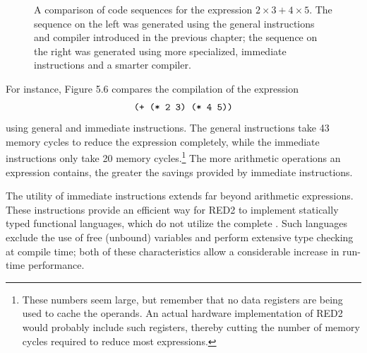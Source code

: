 \begin{figure}[htbp]
\centering
\setlength{\fboxsep}{8pt}
\renewcommand{\arraystretch}{1.15}
\caption[Comparing general and immediate instructions]{A comparison of code sequences for the expression \(2 \times 3 +
4 \times 5\). The sequence on the left was generated using the general
instructions and compiler introduced in the previous chapter; the sequence on
the right was generated using more specialized, immediate instructions and a
smarter compiler.}
\end{figure}

For instance, Figure 5.6 compares the compilation of the expression
\[
\texttt{(+ (* 2 3) (* 4 5))}
\]
using general and immediate instructions. The general instructions take 43
memory cycles to reduce the expression completely, while the immediate
instructions only take 20 memory cycles.\footnote{These numbers seem large, but
remember that no data registers are being used to cache the operands. An actual
hardware implementation of RED2 would probably include such registers, thereby
cutting the number of memory cycles required to reduce most expressions.} The
more arithmetic operations an expression contains, the greater the savings
provided by immediate instructions.

The utility of immediate instructions extends far beyond arithmetic expressions.
These instructions provide an efficient way for RED2 to implement statically
typed functional languages, which do not utilize the complete
\lambdacalculus{}. Such languages exclude the use of free (unbound) variables
and perform extensive type checking at compile time; both of these
characteristics allow a considerable increase in run-time performance.

